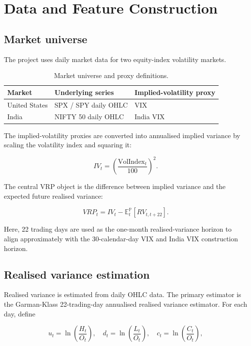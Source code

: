 \documentclass[11pt,a4paper]{article}
\begin{document}
\section{Data and Feature Construction}

\subsection{Market universe}

The project uses daily market data for two equity-index volatility markets.

\begin{table}[H]
\centering
\caption{Market universe and proxy definitions.}
\begin{tabular}{lll}
\toprule
Market & Underlying series & Implied-volatility proxy \\
\midrule
United States & SPX / SPY daily OHLC & VIX \\
India & NIFTY 50 daily OHLC & India VIX \\
\bottomrule
\end{tabular}
\end{table}

The implied-volatility proxies are converted into annualised implied variance by scaling the volatility index and squaring it:

\begin{equation}
IV_t = \left(\frac{\text{VolIndex}_t}{100}\right)^2.
\end{equation}

The central VRP object is the difference between implied variance and the expected future realised variance:

\begin{equation}
VRP_t = IV_t - \mathbb{E}_t^{\mathbb{P}}[RV_{t,t+22}].
\end{equation}

Here, 22 trading days are used as the one-month realised-variance horizon to align approximately with the 30-calendar-day VIX and India VIX construction horizon.

\subsection{Realised variance estimation}

Realised variance is estimated from daily OHLC data. The primary estimator is the Garman-Klass 22-trading-day annualised realised variance estimator. For each day, define

\begin{equation}
 u_t = \ln\left(\frac{H_t}{O_t}\right), \quad d_t = \ln\left(\frac{L_t}{O_t}\right), \quad c_t = \ln\left(\frac{C_t}{O_t}\right),
\end{equation}
\end{document}
